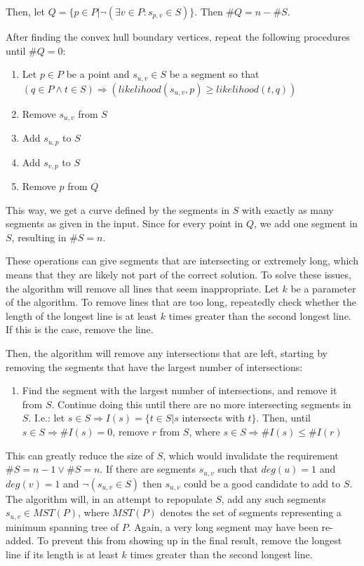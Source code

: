 \documentclass[11pt]{article}
\begin{document}
Then, let $Q = \{ p \in P | \neg ( \exists v \in P : s_{p,v} \in S ) \}$. Then $\#Q = n - \#S$.

After finding the convex hull boundary vertices, repeat the following procedures until $\#Q = 0$:

\begin{enumerate}
\item Let $p \in P$ be a point and $s_{u,v} \in S$ be a segment so that $(q \in P \wedge t \in S ) \Rightarrow ( likelihood(s_{u,v}, p) \geq likelihood(t, q))$
\item Remove $s_{u,v}$ from $S$
\item Add $s_{u, p}$ to $S$
\item Add $s_{v, p}$ to $S$
\item Remove $p$ from $Q$
\end{enumerate}

This way, we get a curve defined by the segments in $S$ with exactly as many segments as given in the input. Since for every point in $Q$, we add one segment in $S$, resulting in $\#S = n$.

These operations can give segments that are intersecting or extremely long, which means that they are likely not part of the correct solution. To solve these issues, the algorithm will remove all lines that seem inappropriate.
Let $k$ be a parameter of the algorithm.
To remove lines that are too long, repeatedly check whether the length of the longest line is at least $k$ times greater than the second longest line. If this is the case, remove the line.

Then, the algorithm will remove any intersections that are left, starting by removing the segments that have the largest number of intersections:

\begin{enumerate}
\item Find the segment with the largest number of intersections, and remove it from $S$. Continue doing this until there are no more intersecting segments in $S$. I.e.: let $s \in S \Rightarrow I(s) = \{ t \in S | s$ intersects with $t \}$. Then, until $s \in S \Rightarrow \#I(s) = 0$, remove $r$ from $S$, where $s \in S \Rightarrow \#I(s) \leq \#I(r)$
\end{enumerate}

This can greatly reduce the size of $S$, which would invalidate the requirement $\#S = n-1 \vee \#S = n$. If there are segments $s_{u,v}$ such that $deg(u) = 1$ and $deg(v) = 1$ and $\neg ( s_{u,v} \in S )$ then $s_{u,v}$ could be a good candidate to add to $S$. The algorithm will, in an attempt to repopulate $S$, add any such segments $s_{u,v} \in MST(P) $, where $MST(P)$ denotes the set of segments representing a minimum spanning tree of $P$. Again, a very long segment may have been re-added.
To prevent this from showing up in the final result, remove the longest line if its length is at least $k$ times greater than the second longest line.
\end{document}
